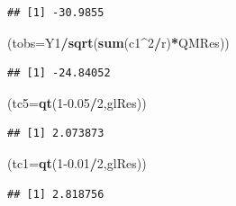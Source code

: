 \documentclass[
]{book}
\newenvironment{Shaded}{\begin{snugshade}}{\end{snugshade}}
\newcommand{\DataTypeTok}[1]{\textcolor[rgb]{0.13,0.29,0.53}{#1}}
\newcommand{\DecValTok}[1]{\textcolor[rgb]{0.00,0.00,0.81}{#1}}
\newcommand{\FloatTok}[1]{\textcolor[rgb]{0.00,0.00,0.81}{#1}}
\newcommand{\KeywordTok}[1]{\textcolor[rgb]{0.13,0.29,0.53}{\textbf{#1}}}
\newcommand{\NormalTok}[1]{#1}
\newcommand{\OperatorTok}[1]{\textcolor[rgb]{0.81,0.36,0.00}{\textbf{#1}}}
\begin{document}
\begin{verbatim}
## [1] -30.9855
\end{verbatim}

\begin{Shaded}
\begin{Highlighting}[]
\NormalTok{(}\DataTypeTok{tobs=}\NormalTok{Y1}\OperatorTok{/}\KeywordTok{sqrt}\NormalTok{(}\KeywordTok{sum}\NormalTok{(c1}\OperatorTok{^}\DecValTok{2}\OperatorTok{/}\NormalTok{r)}\OperatorTok{*}\NormalTok{QMRes))}
\end{Highlighting}
\end{Shaded}

\begin{verbatim}
## [1] -24.84052
\end{verbatim}

\begin{Shaded}
\begin{Highlighting}[]
\NormalTok{(}\DataTypeTok{tc5=}\KeywordTok{qt}\NormalTok{(}\DecValTok{1}\FloatTok{-0.05}\OperatorTok{/}\DecValTok{2}\NormalTok{,glRes))}
\end{Highlighting}
\end{Shaded}

\begin{verbatim}
## [1] 2.073873
\end{verbatim}

\begin{Shaded}
\begin{Highlighting}[]
\NormalTok{(}\DataTypeTok{tc1=}\KeywordTok{qt}\NormalTok{(}\DecValTok{1}\FloatTok{-0.01}\OperatorTok{/}\DecValTok{2}\NormalTok{,glRes))}
\end{Highlighting}
\end{Shaded}

\begin{verbatim}
## [1] 2.818756
\end{verbatim}
\end{document}
